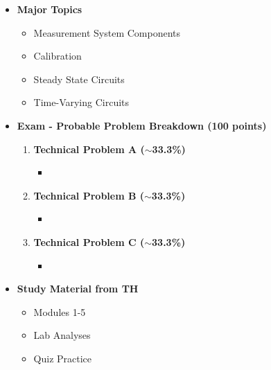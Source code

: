 \documentclass[11pt]{article}
\begin{document}
\begin{itemize}
\newpage

\item\textbf{\Large Major Topics}\\
	\begin{itemize}

		\item  {\large Measurement System Components}
		\item  {\large Calibration}
		\item  {\large Steady State Circuits}
		\item  {\large Time-Varying Circuits}	

	\end{itemize}


%
\item  \textbf{\Large Exam  - Probable Problem Breakdown (100 points) }\\
\Large
	\begin{enumerate}


		\item  \textbf{\Large Technical Problem A ($\sim$33.3\%)}\\
		\begin{itemize}
			\item 
		\end{itemize}
		\item  \textbf{\Large Technical Problem B ($\sim$33.3\%)}\\
		\begin{itemize}
			\item 
		\end{itemize}
		\item  \textbf{\Large Technical Problem C ($\sim$33.3\%)}\\
		\begin{itemize}
			\item 

		\end{itemize}

	\end{enumerate}

\item  \textbf{\Large Study Material from TH}\\
\begin{itemize}

\item Modules 1-5

\item Lab Analyses 

\item Quiz Practice

\end{itemize}

\end{itemize}


	
\end{document}
